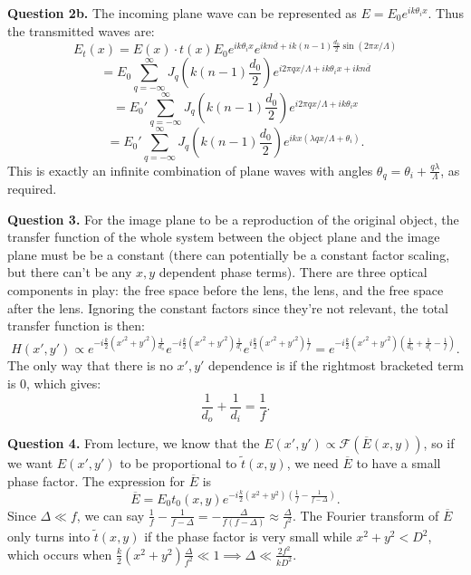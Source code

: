\documentclass[letterpaper, reqno,11pt]{article}
\begin{document}
{\medskip\noindent\bf Question 2b.} The incoming plane wave can be represented as $E=E_0 e^{ik\theta_i x}$. Thus the transmitted waves are:
\[
E_t(x)=E(x)\cdot t(x)E_0 e^{ik\theta_i x} e^{ikn\overline{d}+ik(n-1)\frac{d_0}{2}\sin(2\pi x /\Lambda)}
\]
\[
=E_0\sum_{q=-\infty}^{\infty}J_q\left(k(n-1) \frac{d_0}{2}\right)e^{i 2\pi qx /\Lambda+ik\theta_ix+ikn\overline{d}}
\]
\[
=E_0'\sum_{q=-\infty}^{\infty}J_q\left(k(n-1) \frac{d_0}{2}\right)e^{i 2\pi qx /\Lambda+ik\theta_ix} 
\]
\[
=E_0'\sum_{q=-\infty}^{\infty}J_q\left(k(n-1) \frac{d_0}{2}\right)e^{ikx(\lambda qx /\Lambda+\theta_i)} 
.\]
This is exactly an infinite combination of plane waves with angles $\theta_q=\theta_i+\frac{q\lambda}{\Lambda}$, as required.

{\medskip\noindent\bf Question 3.} For the image plane to be a reproduction of the original object, the transfer function of the whole system between the object plane and the image plane must be be a constant (there can potentially be a constant factor scaling, but there can't be any $x,y$ dependent phase terms). There are three optical components in play: the free space before the lens, the lens, and the free space after the lens. Ignoring the constant factors since they're not relevant, the total transfer function is then:
\[
    H(x',y')\propto e^{-i \frac{k}{2}(x'^2+y'^2) \frac{1}{d_o}}e^{-i \frac{k}{2}(x'^2+y'^2) \frac{1}{d_i}}e^{i \frac{k}{2}(x'^2+y'^2) \frac{1}{f}}=e^{-i \frac{k}{2}(x'^2+y'^2)\left( \frac{1}{d_0}+\frac{1}{d_i}-\frac{1}{f} \right) }
.\]
The only way that there is no $x',y'$ dependence is if the rightmost bracketed term is 0, which gives:
\[
\frac{1}{d_o}+\frac{1}{d_i}=\frac{1}{f}
.\]

{\medskip\noindent\bf Question 4.} From lecture, we know that the $E(x',y')\propto \mathcal F(\overline{E}(x,y))$, so if we want $E(x',y')$ to be proportional to $\tilde t(x,y)$, we need $\overline{E}$ to have a small phase factor. The expression for $\overline{E}$ is
\[
\overline{E}=E_0 t_0(x,y) e^{-i \frac{k}{2}(x^2+y^2)\left( \frac{1}{f}-\frac{1}{f-\Delta} \right) }
.\]
Since $\Delta \ll f$, we can say $\frac{1}{f}-\frac{1}{f-\Delta}= -\frac{\Delta}{f(f-\Delta)}\approx \frac{\Delta}{f^2}$. The Fourier transform of $\overline{E}$ only turns into $\tilde t(x,y)$ if the phase factor is very small while $x^2+y^2<D^2$, which occurs when $\frac{k}{2}(x^2+y^2) \frac{\Delta}{f^2}\ll 1\implies \Delta \ll \frac{2f^2}{kD^2}$.
\end{document}
